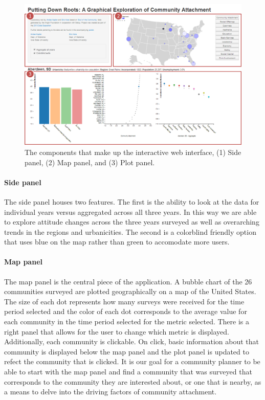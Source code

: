 \documentclass[11pt]{article}\usepackage{knitr}
\begin{document}
\begin{figure}[H]
\centering
\includegraphics[width=\textwidth]{images/tool.png}
\caption{\label{fig:tool} The components that make up the interactive web interface, (1) Side panel, (2) Map panel, and (3) Plot panel.}
\end{figure}

\paragraph{Side panel} The side panel houses two features. The first is the ability to look at the data for individual years versus aggregated across all three years. In this way we are able to explore attitude changes across the three years surveyed as well as overarching trends in the regions and urbanicities. The second is a colorblind friendly option that uses blue on the map rather than green to accomodate more users.

\paragraph{Map panel} The map panel is the central piece of the application. A bubble chart of the 26 communities surveyed are plotted geographically on a map of the United States. The size of each dot represents how many surveys were received for the time period selected and the color of each dot corresponds to the average value for each community in the time period selected for the metric selected. There is a right panel that allows for the user to change which metric is displayed. Additionally, each community is clickable. On click, basic information about that community is displayed below the map panel and the plot panel is updated to refect the community that is clicked. It is our goal for a community planner to be able to start with the map panel and find a community that was surveyed that corresponds to the community they are interested about, or one that is nearby, as a means to delve into the driving factors of community attachment.
\end{document}
